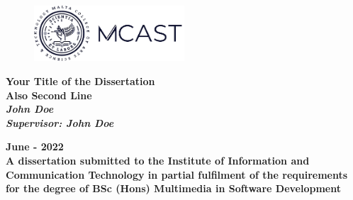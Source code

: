 \begin{titlepage}

\begin{figure}[h!]
\centering
\includegraphics[width=0.5\textwidth, right]{Title/logo.png}
\caption*{}
\label{fig:entropy} 
\end{figure}

\vspace{0.5in}

\centering
\Huge{\textbf{Your Title of the Dissertation\\Also Second Line}}\\[2.0in]

\large{\textit{\textbf{John Doe}}} \\[0.2in]
\large{\textit{\textbf{Supervisor: John Doe}}} \\[0.8in]

\vspace{1.5in}

\normalsize{\textbf{June - 2022}}\\[0.2in]

\normalsize{\textbf{A dissertation submitted to the Institute of Information and Communication Technology in partial fulfilment of
the requirements for the degree of BSc (Hons) Multimedia in Software Development}}\\[0.2in]


\end{titlepage}
\newpage